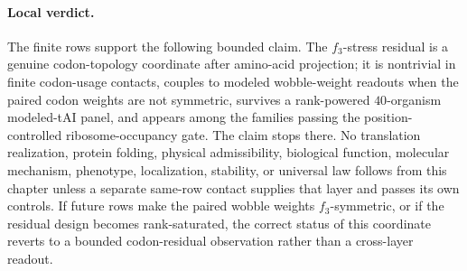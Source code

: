 \paragraph{Local verdict.}
The finite rows support the following bounded claim.  The $f_3$-stress residual is a genuine codon-topology coordinate after amino-acid projection; it is nontrivial in finite codon-usage contacts, couples to modeled wobble-weight readouts when the paired codon weights are not symmetric, survives a rank-powered $40$-organism modeled-tAI panel, and appears among the families passing the position-controlled ribosome-occupancy gate.  The claim stops there.  No translation realization, protein folding, physical admissibility, biological function, molecular mechanism, phenotype, localization, stability, or universal law follows from this chapter unless a separate same-row contact supplies that layer and passes its own controls.  If future rows make the paired wobble weights $f_3$-symmetric, or if the residual design becomes rank-saturated, the correct status of this coordinate reverts to a bounded codon-residual observation rather than a cross-layer readout.
